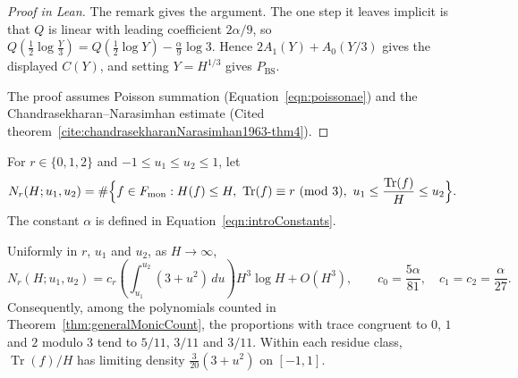 \begin{proof}[Proof in Lean]

\leanok


The remark gives the argument. The one step it leaves implicit is that $Q$ is linear with leading coefficient $2\alpha/9$, so $Q(\frac12\log\frac Y3)=Q(\frac12\log Y)-\frac\alpha9\log3$. Hence $2A_1(Y)+A_0(Y/3)$ gives the displayed $C(Y)$, and setting $Y=H^{1/3}$ gives $P_{\mathrm{BS}}$.

The proof assumes Poisson summation (Equation~\ref{eqn:poissonae}) and the Chandrasekharan--Narasimhan estimate (Cited theorem~\ref{cite:chandrasekharanNarasimhan1963-thm4}).

\end{proof}

\begin{theorem}

\label{thm:traceDistribution}


\leanok

For $r\in\{0,1,2\}$ and $-1\leq u_1\leq u_2\leq1$, let \[N_r(H;u_1,u_2)=\#\Bigl\{f\in F_{\mathrm{mon}}:H(f)\leq H,\ \operatorname{Tr}(f)\equiv r\ (\mathrm{mod}\ 3),\ u_1\leq\frac{\operatorname{Tr}(f)}{H}\leq u_2\Bigr\}.\] The constant $\alpha$ is defined in Equation~\ref{eqn:introConstants}.

 Uniformly in $r$, $u_1$ and $u_2$, as $H\to\infty$, \[ N_r(H;u_1,u_2) =c_r\left(\int_{u_1}^{u_2}(3+u^2)\,du\right)H^3\log H+O(H^3), \qquad c_0=\frac{5\alpha}{81},\quad c_1=c_2=\frac{\alpha}{27}. \] Consequently, among the polynomials counted in Theorem~\ref{thm:generalMonicCount}, the proportions with trace congruent to $0$, $1$ and $2$ modulo $3$ tend to $5/11$, $3/11$ and $3/11$. Within each residue class, $\operatorname{Tr}(f)/H$ has limiting density $\frac{3}{20}(3+u^2)$ on $[-1,1]$. 

\end{theorem}

